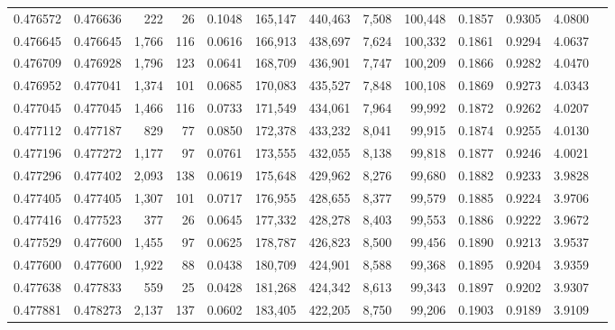 \begin{tabular}{rrrrrrrrrrrrr}
0.476572 & 0.476636 &   222 &    26 &                                     0.1048 & 165,147 & 440,463 &   7,508 & 100,448 & 0.1857 & 0.9305 & 4.0800 \\
0.476645 & 0.476645 & 1,766 &   116 &                                     0.0616 & 166,913 & 438,697 &   7,624 & 100,332 & 0.1861 & 0.9294 & 4.0637 \\
0.476709 & 0.476928 & 1,796 &   123 &                                     0.0641 & 168,709 & 436,901 &   7,747 & 100,209 & 0.1866 & 0.9282 & 4.0470 \\
0.476952 & 0.477041 & 1,374 &   101 &                                     0.0685 & 170,083 & 435,527 &   7,848 & 100,108 & 0.1869 & 0.9273 & 4.0343 \\
0.477045 & 0.477045 & 1,466 &   116 &                                     0.0733 & 171,549 & 434,061 &   7,964 &  99,992 & 0.1872 & 0.9262 & 4.0207 \\
0.477112 & 0.477187 &   829 &    77 &                                     0.0850 & 172,378 & 433,232 &   8,041 &  99,915 & 0.1874 & 0.9255 & 4.0130 \\
0.477196 & 0.477272 & 1,177 &    97 &                                     0.0761 & 173,555 & 432,055 &   8,138 &  99,818 & 0.1877 & 0.9246 & 4.0021 \\
0.477296 & 0.477402 & 2,093 &   138 &                                     0.0619 & 175,648 & 429,962 &   8,276 &  99,680 & 0.1882 & 0.9233 & 3.9828 \\
0.477405 & 0.477405 & 1,307 &   101 &                                     0.0717 & 176,955 & 428,655 &   8,377 &  99,579 & 0.1885 & 0.9224 & 3.9706 \\
0.477416 & 0.477523 &   377 &    26 &                                     0.0645 & 177,332 & 428,278 &   8,403 &  99,553 & 0.1886 & 0.9222 & 3.9672 \\
0.477529 & 0.477600 & 1,455 &    97 &                                     0.0625 & 178,787 & 426,823 &   8,500 &  99,456 & 0.1890 & 0.9213 & 3.9537 \\
0.477600 & 0.477600 & 1,922 &    88 &                                     0.0438 & 180,709 & 424,901 &   8,588 &  99,368 & 0.1895 & 0.9204 & 3.9359 \\
0.477638 & 0.477833 &   559 &    25 &                                     0.0428 & 181,268 & 424,342 &   8,613 &  99,343 & 0.1897 & 0.9202 & 3.9307 \\
0.477881 & 0.478273 & 2,137 &   137 &                                     0.0602 & 183,405 & 422,205 &   8,750 &  99,206 & 0.1903 & 0.9189 & 3.9109 \\

\end{tabular}
